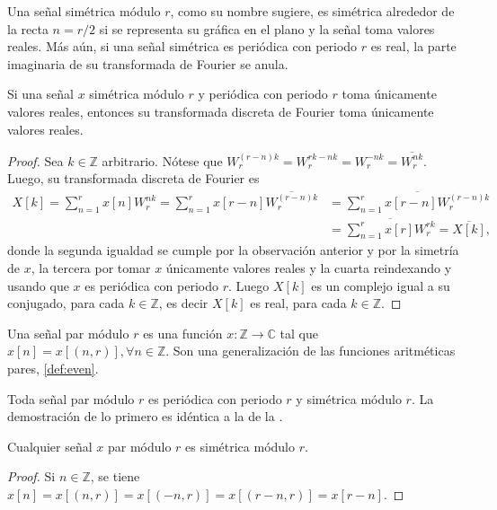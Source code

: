 Una señal simétrica módulo $r$, como su nombre sugiere, es simétrica alrededor de la recta $n = r/2$ si se representa su gráfica en el plano y la señal toma valores reales. Más aún, si una señal simétrica es periódica con periodo $r$ es real, la parte imaginaria de su transformada de Fourier se anula.

\begin{proposition}\label{prop:real}
Si una señal $x$ simétrica módulo $r$ y periódica con periodo $r$ toma únicamente valores reales, entonces su transformada discreta de Fourier toma únicamente valores reales.
\end{proposition}

\begin{proof}
Sea $k \in \mathbb{Z}$ arbitrario. Nótese que $W_r^{(r-n)k} = W_r^{rk-nk} = W_r^{-n k} = \overline{W_r^{nk}}$. Luego, su transformada discreta de Fourier es
\begin{align*}
    X[k] = \sum_{n=1}^{r} x[n] W_r^{n k} = \sum_{n=1}^{r} x[r-n] \overline{W_r^{(r-n) k}} & = \overline{\sum_{n=1}^{r} x[r-n] W_r^{(r-n) k}} \\
                                                                                          & = \overline{\sum_{n=1}^{r} x[r] W_r^{r k}} = \overline{X[k]},
\end{align*}
donde la segunda igualdad se cumple por la observación anterior y por la simetría de $x$, la tercera por tomar $x$ únicamente valores reales y la cuarta reindexando y usando que $x$ es periódica con periodo $r$. Luego $X[k]$ es un complejo igual a su conjugado, para cada $k \in \mathbb{Z}$, es decir $X[k]$ es real, para cada $k \in \mathbb{Z}$.
\end{proof}

\begin{definition}
Una señal par módulo $r$ es una función $x : \mathbb{Z} \longrightarrow \mathbb{C}$ tal que $x[n] = x[(n,r)], \forall n \in \mathbb{Z}$. Son una generalización de las funciones aritméticas pares, \cref{def:even}.
\end{definition}

Toda señal par módulo $r$ es periódica con periodo $r$ y simétrica módulo $r$. La demostración de lo primero es idéntica a la de la .

\begin{proposition}
Cualquier señal $x$ par módulo $r$ es simétrica módulo $r$.
\end{proposition}

\begin{proof}
Si $n \in \mathbb{Z}$, se tiene $x[n] = x[(n,r)] = x[(-n,r)] = x[(r-n,r)] = x[r-n]$.
\end{proof}

